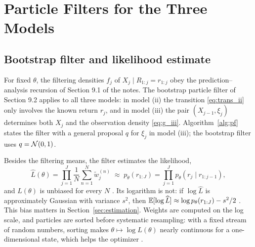 \section{Particle Filters for the Three Models}

\subsection{Bootstrap filter and likelihood estimate}

For fixed $\theta$, the filtering densities $f_j$ of $X_j \mid R_{1:j} = r_{1:j}$ obey the prediction--analysis recursion of Section 9.1 of the notes. The bootstrap particle filter of Section 9.2 applies to all three models: in model (ii) the transition \eqref{eq:trans_ii} only involves the known return $r_j$, and in model (iii) the pair $(X_{j-1}, \xi_j)$ determines both $X_j$ and the observation density \eqref{eq:g_iii}. Algorithm~\ref{alg:pf} states the filter with a general proposal $q$ for $\xi_j$ in model (iii); the bootstrap filter uses $q = \mathcal{N}(0,1)$.

Besides the filtering means, the filter estimates the likelihood,
\begin{equation}
        \hat L(\theta) = \prod_{j=1}^J \frac1N\sum_{n=1}^N \tilde w_j^{(n)}
        \;\approx\; p_\theta(r_{1:J}) = \prod_{j=1}^J p_\theta(r_j \mid r_{1:j-1}),
        \label{eq:Lhat}
\end{equation}
and $\hat L(\theta)$ is unbiased for every $N$ \cite{delMoral2004, chopinPapaspiliopoulos2020}. Its logarithm is not: if $\log\hat L$ is approximately Gaussian with variance $s^2$, then $\operatorname{\mathbb{E}}[\log\widehat L] \approx \log p_\theta(r_{1:J}) - s^2/2$ \cite{doucetEtAl2015}. This bias matters in Section~\ref{sec:estimation}. Weights are computed on the log scale, and particles are sorted before systematic resampling: with a fixed stream of random numbers, sorting makes $\theta \mapsto \log\hat L(\theta)$ nearly continuous for a one-dimensional state, which helps the optimizer \cite{malikPitt2011}.

